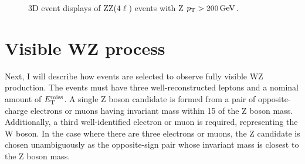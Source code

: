 \clearpage
\begin{figure}[!htb]
\centering
\setlength{\fboxsep}{0pt}
\setlength{\fboxrule}{0.3pt}
\vspace{1cm}

\vspace{1cm}

\caption{3D event displays of ZZ($4\ell$) events with Z $p_\mathrm{T} > 200 \,\text{Ge\hspace{-.08em}V}$. 
\eventDisplayCaption
\label{fig:zz4l_eventdisplay}}
\end{figure}
\clearpage


\section{Visible WZ process}
\label{sec:wz3l}
Next, I will describe how events are selected to observe fully visible WZ production. 
The events must have three well-reconstructed leptons and a nominal amount of $E_\mathrm{T}^{\mathrm{miss}}$.
A single Z boson candidate is formed from a pair of opposite-charge electrons or muons having invariant mass within 15 \GeV of the Z boson mass.
Additionally, a third well-identified electron or muon is required, representing the W boson.
In the case where there are three electrons or muons,
the Z candidate is chosen unambiguously as the opposite-sign pair whose invariant mass is closest to the Z boson mass.

